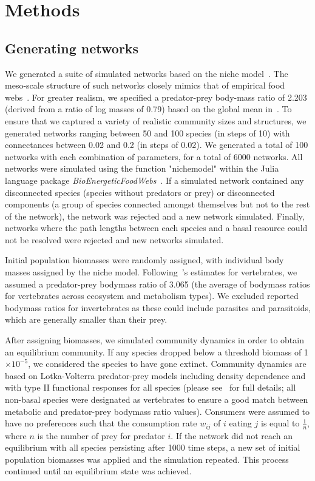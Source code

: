 \documentclass[12pt]{article}
\begin{document}
\section{Methods}

	\subsection*{Generating networks}

		We generated a suite of simulated networks based on the niche model~\citep{Williams2000}. The meso-scale structure of such networks closely mimics that of empirical food webs~\citep{Stouffer2007}. For greater realism, we specified a predator-prey body-mass ratio of 2.203 (derived from a ratio of log masses of 0.79) based on the global mean in~\citet{Brose2006}. To ensure that we captured a variety of realistic community sizes and structures, we generated networks ranging between 50 and 100 species (in steps of 10) with connectances between 0.02 and 0.2 (in steps of 0.02). We generated a total of 100 networks with each combination of parameters, for a total of 6000 networks. All networks were simulated using the function "nichemodel" within the Julia language package \emph{BioEnergeticFoodWebs}~\citep{bioenergeticfw,Delmas2017}. If a simulated network contained any disconnected species (species without predators or prey) or disconnected components (a group of species connected amongst themselves but not to the rest of the network), the network was rejected and a new network simulated. Finally, networks where the path lengths between each species and a basal resource could not be resolved were rejected and new networks simulated.


		Initial population biomasses were randomly assigned, with individual body masses assigned by the niche model. Following~\citet{Brose2006}'s estimates for vertebrates, we assumed a predator-prey bodymass ratio of 3.065 (the average of bodymass ratios for vertebrates across ecosystem and metabolism types). We excluded reported bodymass ratios for invertebrates as these could include parasites and parasitoids, which are generally smaller than their prey. 


		After assigning biomasses, we simulated community dynamics  in order to obtain an equilibrium community. If any species dropped below a threshold biomass of 1$\times10^{-5}$, we considered the species to have gone extinct. Community dynamics are based on Lotka-Volterra predator-prey models including density dependence and with type II functional responses for all species (please see~\citet{Delmas2017} for full details; all non-basal species were designated as vertebrates to ensure a good match between metabolic and predator-prey bodymass ratio values). Consumers were assumed to have no preferences such that the consumption rate $w_{ij}$ of $i$ eating $j$ is equal to $\frac{1}{n}$, where $n$ is the number of prey for predator $i$. If the network did not reach an equilibrium with all species persisting after 1000 time steps, a new set of initial population biomasses was applied and the simulation repeated. This process continued until an equilibrium state was achieved.
\end{document}
